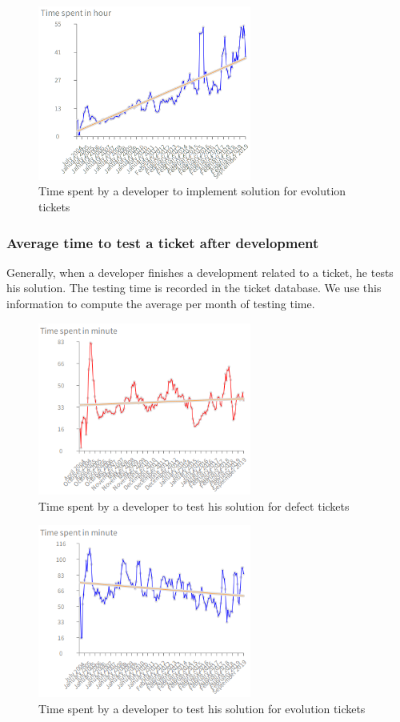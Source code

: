 \documentclass[10pt,conference]{IEEEtran}
\begin{document}
\begin{figure}[H]
  \centering
  \includegraphics[width=70mm]{./images/devEvol.png}
  \caption{Time spent by a developer to implement solution for  evolution tickets}
  \label{fig:devTimeEvol}
\end{figure}

\subsubsection{Average time  to test a ticket after development}

Generally, when a developer finishes a development related to a ticket, he tests his solution.  
The testing time is recorded in the ticket database.
 We use this information to compute the average per month of testing time. 

 \begin{figure}[H]
  \centering
  \includegraphics[width=70mm]{./images/timeDevTest.png}
  \caption{Time spent by a developer to test his solution for  defect tickets}
  \label{fig:devTimeTestBug}
\end{figure}

\begin{figure}[H]
  \centering
  \includegraphics[width=70mm]{./images/evolutionTest.png}
  \caption{Time spent by a developer to test his solution for  evolution tickets}
  \label{fig:devTimeTestEvol}
\end{figure}
\end{document}
